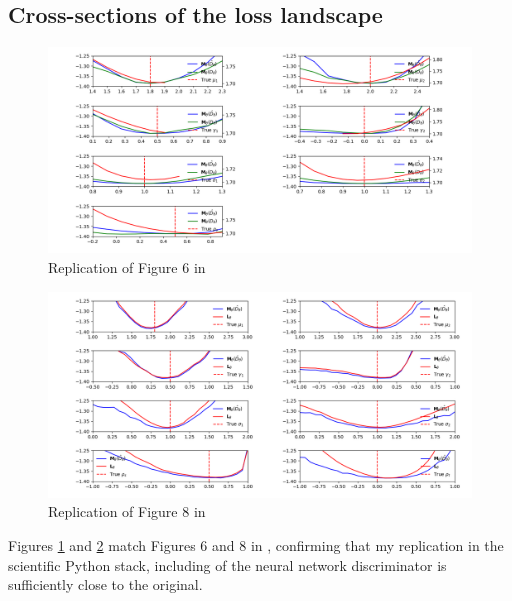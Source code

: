 \subsection{Cross-sections of the loss landscape}

\begin{figure}
    \includegraphics[width=\textwidth]{./Images/kmp_figure_6.png}
    \caption{Replication of Figure 6 in \cite{kaji2023adversarial}}
    \label{fig:kmp_figure_6}
\end{figure}

\begin{figure}
    \includegraphics[width=\textwidth]{./Images/kmp_figure_8_sp.png}
    \caption{Replication of Figure 8 in \cite{kaji2023adversarial}}
    \label{fig:kmp_figure_8_sp}
\end{figure}

Figures \ref{fig:kmp_figure_6} and \ref{fig:kmp_figure_8_sp} match Figures 6 and 8 in \cite{kaji2023adversarial}, confirming that my replication in the scientific Python stack, including of the neural network discriminator is sufficiently close to the original.  

